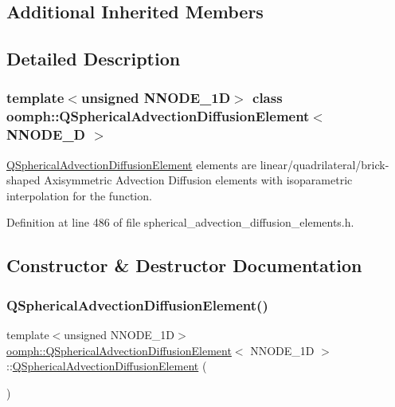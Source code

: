 \subsection*{Additional Inherited Members}


\subsection{Detailed Description}
\subsubsection*{template$<$unsigned N\+N\+O\+D\+E\+\_\+1D$>$\newline
class oomph\+::\+Q\+Spherical\+Advection\+Diffusion\+Element$<$ N\+N\+O\+D\+E\+\_\+D $>$}

\hyperlink{classoomph_1_1QSphericalAdvectionDiffusionElement}{Q\+Spherical\+Advection\+Diffusion\+Element} elements are linear/quadrilateral/brick-\/shaped Axisymmetric Advection Diffusion elements with isoparametric interpolation for the function. 

Definition at line 486 of file spherical\+\_\+advection\+\_\+diffusion\+\_\+elements.\+h.



\subsection{Constructor \& Destructor Documentation}
\mbox{\label{classoomph_1_1QSphericalAdvectionDiffusionElement_a7a82f6fad31e48bcc3fe1e1d7b818a74}} 
\subsubsection{\texorpdfstring{Q\+Spherical\+Advection\+Diffusion\+Element()}{QSphericalAdvectionDiffusionElement()}\hspace{0.1cm}{\footnotesize\ttfamily [1/2]}}
{\footnotesize\ttfamily template$<$unsigned N\+N\+O\+D\+E\+\_\+1D$>$ \\
\hyperlink{classoomph_1_1QSphericalAdvectionDiffusionElement}{oomph\+::\+Q\+Spherical\+Advection\+Diffusion\+Element}$<$ N\+N\+O\+D\+E\+\_\+1D $>$\+::\hyperlink{classoomph_1_1QSphericalAdvectionDiffusionElement}{Q\+Spherical\+Advection\+Diffusion\+Element} (\begin{DoxyParamCaption}{ }\end{DoxyParamCaption})\hspace{0.3cm}{\ttfamily [inline]}}



